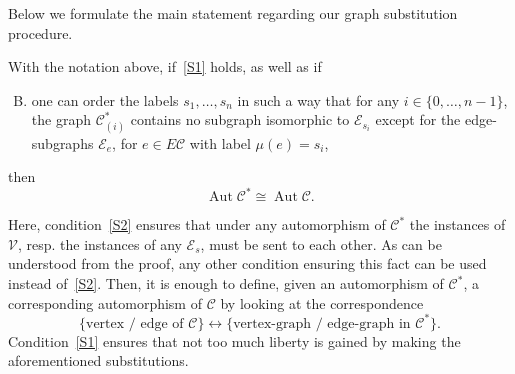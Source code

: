 \documentclass[ALCO,ThmDefs,Unicode,epreuves]{cedram}
\newcommand{\cC}{\mathcal{C}}
\newcommand{\cV}{\mathcal{V}}
\newcommand{\cE}{\mathcal{E}}
\DeclareMathOperator{\aut}{Aut}
\begin{document}
Below we formulate the main statement regarding our graph substitution procedure. 

\begin{prop} \label{prop:graph-substitution}
With the notation above, if~\ref{S1} holds, as well as if
\begin{enumerate}[S.\arabic*] %
\setcounter{enumi}{1}
\item \label{S2}
one can order the labels $s_{1}, \dots, s_n$ in such a way that for any $i\in\{0, \dots, n-1\}$, the graph $\cC^*_{(i)}$ contains no subgraph isomorphic to $\cE_{s_{i}}$ except for the edge-subgraphs $\cE_{e}$, for $e\in E\cC$ with label ${\mu}(e)=s_{i}$,
\end{enumerate}
then
\[
\aut \cC^* \cong \aut \cC.
\]
\end{prop}

Here, condition~\ref{S2} ensures that under any automorphism of $\cC^*$ the instances of $\cV$, resp. the instances of any $\cE_s$, must be sent to each other. As can be understood from the proof, any other condition ensuring this fact can be used instead of~\ref{S2}. Then, it is enough to define, given an automorphism of $\cC^*$, a corresponding automorphism of $\cC$ by looking at the correspondence 
\[
\{\text{vertex / edge of } \cC\} \leftrightarrow \{\text{vertex-graph / edge-graph in } \cC^*\}.
\] 
Condition~\ref{S1} ensures that not too much liberty is gained by making the aforementioned substitutions.
\end{document}
